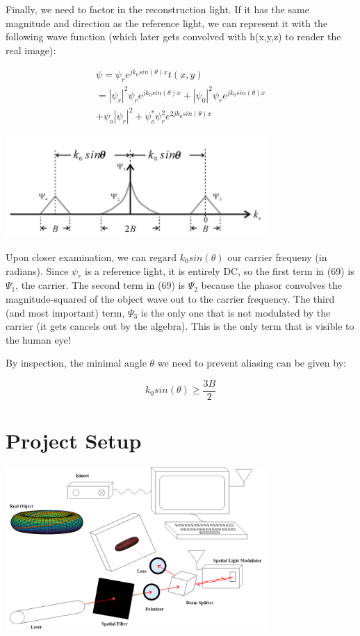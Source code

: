 \documentclass[12pt]{article}
\begin{document}
Finally, we need to factor in the reconstruction light. If it has the same magnitude and direction
as the reference light, we can represent it with the following wave function (which
later gets convolved with h(x,y,z) to render the real image):

\begin{equation}
	\begin{multlined}
	\psi = \psi_{r}e^{jk_{0}sin(\theta)x}t(x,y)
	\\=|\psi_{r}|^2\psi_{r}e^{jk_{0}sin(\theta)x} + |\psi_{0}|^2\psi_{r}e^{jk_{0}sin(\theta)x}
	\\+ \psi_{o}|\psi_{r}|^2 + \psi_{o}^*\psi_{r}^2e^{2jk_{0}sin(\theta)x}
	\end{multlined}
\end{equation}

\begin{center}
\includegraphics[width=100mm]{tupac14.png}
\end{center}

Upon closer examination, we can regard \(k_{0}sin(\theta)\) our carrier frequeny (in radians). Since \(\psi_{r}\) is a reference light, it is entirely DC, so the first term
in (69) is \(\Psi_{1}\), the carrier.
The second term in (69) is \(\Psi_{2}\) because the phasor convolves the magnitude-squared of the object wave out to the carrier frequency.
The third (and most important) term, \(\Psi_{3}\) is the only one that is not modulated by the carrier (it gets cancels out by the algebra). 
This is the only term that is visible to the human eye!

By inspection, the minimal angle \(\theta\) we need to prevent aliasing can be given by:

\begin{equation}
	k_{0}sin(\theta) \geq \frac{3B}{2}
\end{equation}

\section{Project Setup}

\begin{center}
\includegraphics[width=100mm]{tupac10.png}
\end{center}
\end{document}

